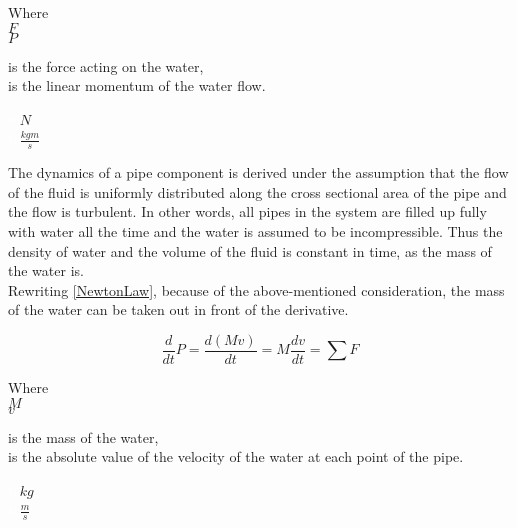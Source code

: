 \begin{minipage}[t]{0.20\textwidth}
Where\\
\hspace*{8mm} $F$ \\
\hspace*{8mm} $P$ 
\end{minipage}
\begin{minipage}[t]{0.68\textwidth}
\vspace*{2mm}
is the force acting on the water,\\
is the linear momentum of the water flow.

\end{minipage}
\begin{minipage}[t]{0.10\textwidth}
\vspace*{2mm}
\textcolor{White}{te}$\unit{N}$\\
\textcolor{White}{te}$\unit{\frac{kgm}{s}}$
\end{minipage}

The dynamics of a pipe component is derived under the assumption that the flow of the fluid is uniformly distributed along the cross sectional area of the pipe and the flow is turbulent. In other words, all pipes in the system are filled up fully with water all the time and the water is assumed to be incompressible. Thus the density of water and the volume of the fluid is constant in time, as the mass of the water is.
\\
Rewriting \eqref{NewtonLaw}, because of the above-mentioned consideration, the mass of the water can be taken out in front of the derivative.

\begin{equation}
  \frac{d}{dt} P = {\frac{d(M v)}{dt}} = M \frac{dv}{dt} = \sum F
\end{equation} 

\begin{minipage}[t]{0.20\textwidth}
Where\\
\hspace*{8mm} $M$ \\
\hspace*{8mm} $v$ 
\end{minipage}
\begin{minipage}[t]{0.68\textwidth}
\vspace*{2mm}
is the mass of the water,\\
is the absolute value of the velocity of the water at each point of the pipe.

\end{minipage}
\begin{minipage}[t]{0.10\textwidth}
\vspace*{2mm}
\textcolor{White}{te}$\unit{kg}$\\
\textcolor{White}{te}$\unit{\frac{m}{s}}$
\end{minipage}


